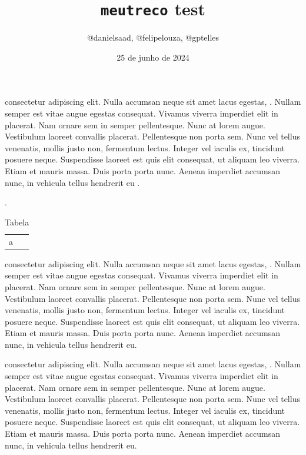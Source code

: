 \documentclass[12pt]{article}
\title{\texttt{meutreco} test}
\author{@danielsaad, @felipelouza, @gptelles}
\begin{document}
\date{25 de junho de 2024}
\maketitle

\listofchanges




 consectetur adipiscing elit. Nulla accumsan neque sit amet lacus egestas, . Nullam semper est vitae augue egestas consequat. Vivamus viverra imperdiet elit in placerat. Nam ornare sem in semper pellentesque. Nunc at lorem augue. Vestibulum laoreet convallis placerat. Pellentesque non porta sem. Nunc vel tellus venenatis, mollis justo non, fermentum lectus. Integer vel iaculis ex, tincidunt posuere neque. Suspendisse laoreet est quis elit consequat, ut aliquam leo viverra. Etiam et mauris massa. Duis porta porta nunc. Aenean imperdiet accumsan nunc, in vehicula tellus hendrerit eu
.

.
\begin{table}[h!]
    \caption{Tabela}
    \label{ref:tab}
    \begin{tabular}{l}
        a
    \end{tabular}
\end{table}


 consectetur adipiscing elit. Nulla accumsan neque sit amet lacus egestas, . Nullam semper est vitae augue egestas consequat. Vivamus viverra imperdiet elit in placerat. Nam ornare sem in semper pellentesque. Nunc at lorem augue. Vestibulum laoreet convallis placerat. Pellentesque non porta sem. Nunc vel tellus venenatis, mollis justo non, fermentum lectus. Integer vel iaculis ex, tincidunt posuere neque. Suspendisse laoreet est quis elit consequat, ut aliquam leo viverra. Etiam et mauris massa. Duis porta porta nunc. Aenean imperdiet accumsan nunc, in vehicula tellus hendrerit eu.



 consectetur adipiscing elit. Nulla accumsan neque sit amet lacus egestas, . Nullam semper est vitae augue egestas consequat. Vivamus viverra imperdiet elit in placerat. Nam ornare sem in semper pellentesque. Nunc at lorem augue. Vestibulum laoreet convallis placerat. Pellentesque non porta sem. Nunc vel tellus venenatis, mollis justo non, fermentum lectus. Integer vel iaculis ex, tincidunt posuere neque. Suspendisse laoreet est quis elit consequat, ut aliquam leo viverra. Etiam et mauris massa. Duis porta porta nunc. Aenean imperdiet accumsan nunc, in vehicula tellus hendrerit eu.
\end{document}

